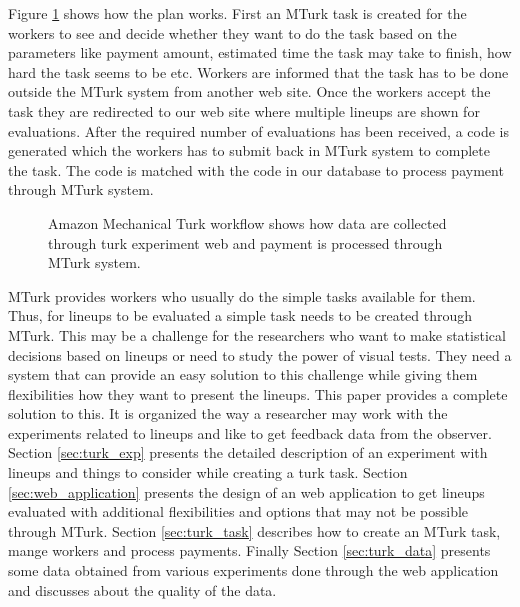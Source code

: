 \documentclass[11pt]{article}
\begin{document}
Figure \ref{fig:turk_work_flow} shows how the plan works. First an MTurk task is created for the workers to see and decide whether they want to do the task based on the parameters like payment amount, estimated time the task may take to finish, how hard the task seems to be etc. Workers are informed that the task has to be done outside the MTurk system from another web site. Once the workers accept the task they are redirected to our web site where multiple lineups are shown for evaluations. After the required number of evaluations has been received, a code is generated which the workers has to submit back in MTurk system to complete the task. The code is matched with the code in our database to process payment through MTurk system.

\begin{figure}[htbp]
   \centering
       \caption{Amazon Mechanical Turk workflow shows how data are collected through turk experiment web and payment is processed through MTurk system.}
       \label{fig:turk_work_flow}
\end{figure}

MTurk provides workers who usually do the simple tasks available for them. Thus, for lineups to be evaluated a simple task needs to be created through MTurk. This may be a challenge for the researchers who want to make statistical decisions based on lineups or need to study the power of visual tests. They need a system that can provide an easy solution to this challenge while giving them flexibilities how they want to present the lineups. This paper provides a complete solution to this. It is organized the way a researcher may work with the experiments related to lineups and like to get feedback data from the observer. Section \ref{sec:turk_exp} presents the detailed description of an experiment with lineups and things to consider while creating a turk task. Section \ref{sec:web_application} presents the design of an web application to get lineups evaluated with additional flexibilities and options that may not be possible through MTurk. Section \ref{sec:turk_task} describes how to create an MTurk task, mange workers and process payments. Finally Section \ref{sec:turk_data} presents some data obtained from various experiments done through the web application and discusses about the quality of the data.
\end{document}
